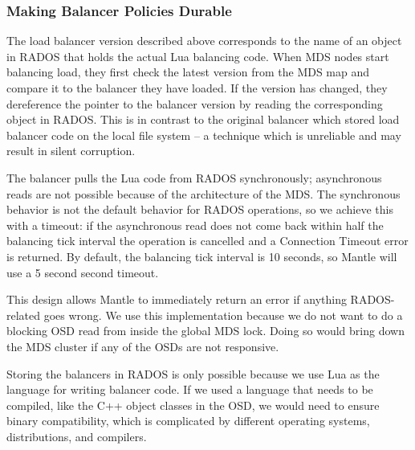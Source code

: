 \documentclass[preprint]{sigplanconf-eurosys}
\begin{document}

\subsubsection{Making Balancer Policies Durable}

The load balancer version described above corresponds to the name of an object
in RADOS that holds the actual Lua balancing code.  When MDS nodes start
balancing load, they first check the latest version from the MDS map and
compare it to the balancer they have loaded. If the version has changed, they
dereference the pointer to the balancer version by reading the corresponding
object in RADOS. This is in contrast to the original balancer which stored load
balancer code on the local file system -- a technique which is unreliable and
may result in silent corruption.

The balancer pulls the Lua code from RADOS synchronously; asynchronous reads
are not possible because of the architecture of the MDS. The synchronous
behavior is not the default behavior for RADOS operations, so we achieve this
with a timeout: if the asynchronous read does not come back within half the
balancing tick interval the operation is cancelled and a Connection Timeout
error is returned. By default, the balancing tick interval is 10 seconds, so
Mantle will use a 5 second second timeout.

This design allows Mantle to immediately return an error if anything
RADOS-related goes wrong.  We use this implementation because we do not want to
do a blocking OSD read from inside the global MDS lock. Doing so would bring
down the MDS cluster if any of the OSDs are not responsive.

Storing the balancers in RADOS is only possible because we use Lua as the
language for writing balancer code. If we used a language that needs to be
compiled, like the C++ object classes in the OSD, we would need to ensure
binary compatibility, which is complicated by different operating systems,
distributions, and compilers.
\end{document}
